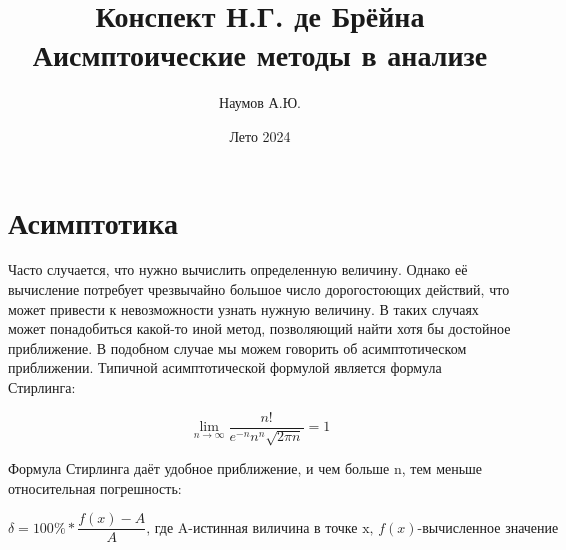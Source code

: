 \documentclass{report}
\title{Конспект Н.Г. де Брёйна Аисмптоические методы в анализе}
\author{Наумов А.Ю.}
\date{Лето 2024}
\begin{document}
\section{Асимптотика}
Часто случается, что нужно вычислить определенную величину. Однако её вычисление потребует чрезвычайно большое число дорогостоющих действий, что может привести к невозможности узнать нужную величину.
В таких случаях может понадобиться какой-то иной метод, позволяющий найти хотя бы достойное приближение. В подобном случае мы можем говорить об асимптотическом приближении.
Типичной асимптотической формулой является формула Стирлинга:
\begin{center}
\[ \lim\limits_{n \to \infty} \frac{n!}{e^{-n}n^{n}\sqrt{2\pi n}} = 1 \]
\end{center}
\begin{center}
\end{center}
Формула Стирлинга даёт удобное приближение, и чем больше n, тем меньше относительная погрешность:

\begin{center}
\[ \delta = 100\% * \frac{f(x) - A}{A} \textrm{, где A-истинная виличина в точке x, $f(x)$-вычисленное значение} \]
\end{center}
\end{document}
